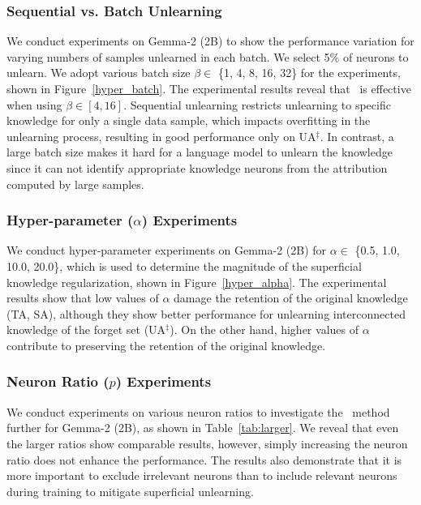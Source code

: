 \subsubsection{Sequential vs. Batch Unlearning}
\label{apx:batch}
We conduct experiments on Gemma-2 (2B) to show the performance variation for varying numbers of samples unlearned in each batch.
We select 5\% of neurons to unlearn.
We adopt various batch size $\beta \in$ \{1, 4, 8, 16, 32\} for the experiments, shown in Figure~\ref{hyper_batch}.
The experimental results reveal that \ourmodel~is effective when using $\beta \in [4, 16]$.
Sequential unlearning restricts unlearning to specific knowledge for only a single data sample, which impacts overfitting in the unlearning process, resulting in good performance only on UA$^{\ddag}$.
In contrast, a large batch size makes it hard for a language model to unlearn the knowledge since it can not identify appropriate knowledge neurons from the attribution computed by large samples.





\subsubsection{Hyper-parameter ($\alpha$) Experiments}
\label{apx:alpha}
We conduct hyper-parameter experiments on Gemma-2 (2B) for $\alpha \in$ \{0.5, 1.0, 10.0, 20.0\}, which is used to determine the magnitude of the superficial knowledge regularization, shown in Figure~\ref{hyper_alpha}.
The experimental results show that low values of $\alpha$ damage the retention of the original knowledge (TA, SA), although they show better performance for unlearning interconnected knowledge of the forget set (UA$^{\ddag}$).
On the other hand, higher values of $\alpha$ contribute to preserving the retention of the original knowledge.





\subsubsection{Neuron Ratio ($p$) Experiments}
\label{apx:neuron_ratio}
We conduct experiments on various neuron ratios to investigate the \ourmodel~method further for Gemma-2 (2B), as shown in Table~\ref{tab:larger}.
We reveal that even the larger ratios show comparable results, however, simply increasing the neuron ratio does not enhance the performance.
The results also demonstrate that it is more important to exclude irrelevant neurons than to include relevant neurons during training to mitigate superficial unlearning.

